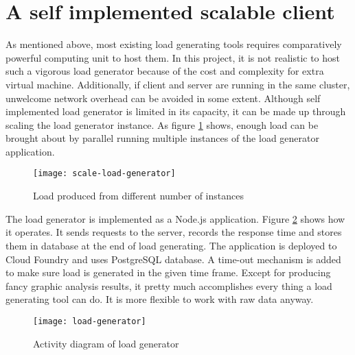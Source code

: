 \section{A self implemented scalable client}
	\label{scale-load-generator}
As mentioned above, most existing load generating tools requires comparatively powerful computing unit to host them. In this project, it is not realistic to host such a vigorous load generator because of the cost and complexity for extra virtual machine. Additionally, if client and server are running in the same cluster, unwelcome network overhead can be avoided in some extent. Although self implemented load generator is limited in its capacity, it can be made up through scaling the load generator instance. As figure  \ref{scale-load-generator} shows, enough load can be brought about by parallel running multiple instances of the load generator application.
\begin{figure}[h]
	\centering
	\texttt{[image: scale-load-generator]}
	\caption{Load produced from different number of instances}
	\label{scale-load-generator}
\end{figure}


The load generator is implemented as a Node.js application. Figure \ref{load-generator} shows how it operates. It sends requests to the server, records the response time and stores them in database at the end of load generating. The application is deployed to Cloud Foundry and uses PostgreSQL database. A time-out mechanism is added to make sure load is generated in the given time frame. Except for producing fancy graphic analysis results, it pretty much accomplishes every thing a load generating tool can do. It is more flexible to work with raw data anyway.

 \begin{figure}[h]
	\centering
	\texttt{[image: load-generator]}
	\caption{Activity diagram of load generator}
	\label{load-generator}
\end{figure}


